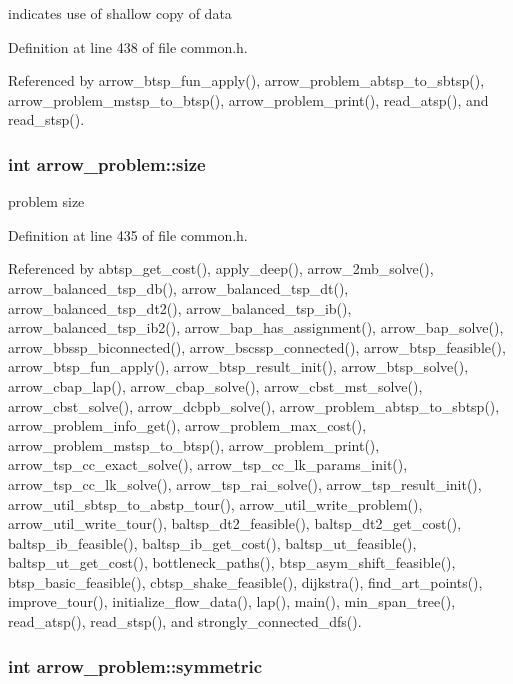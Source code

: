 indicates use of shallow copy of data 

Definition at line 438 of file common.h.

Referenced by arrow\_\-btsp\_\-fun\_\-apply(), arrow\_\-problem\_\-abtsp\_\-to\_\-sbtsp(), arrow\_\-problem\_\-mstsp\_\-to\_\-btsp(), arrow\_\-problem\_\-print(), read\_\-atsp(), and read\_\-stsp().\hypertarget{structarrow__problem_de8573ddc391d06b08b65923fca693ec}{
\subsubsection[{size}]{\setlength{\rightskip}{0pt plus 5cm}int {\bf arrow\_\-problem::size}}}
\label{structarrow__problem_de8573ddc391d06b08b65923fca693ec}


problem size 

Definition at line 435 of file common.h.

Referenced by abtsp\_\-get\_\-cost(), apply\_\-deep(), arrow\_\-2mb\_\-solve(), arrow\_\-balanced\_\-tsp\_\-db(), arrow\_\-balanced\_\-tsp\_\-dt(), arrow\_\-balanced\_\-tsp\_\-dt2(), arrow\_\-balanced\_\-tsp\_\-ib(), arrow\_\-balanced\_\-tsp\_\-ib2(), arrow\_\-bap\_\-has\_\-assignment(), arrow\_\-bap\_\-solve(), arrow\_\-bbssp\_\-biconnected(), arrow\_\-bscssp\_\-connected(), arrow\_\-btsp\_\-feasible(), arrow\_\-btsp\_\-fun\_\-apply(), arrow\_\-btsp\_\-result\_\-init(), arrow\_\-btsp\_\-solve(), arrow\_\-cbap\_\-lap(), arrow\_\-cbap\_\-solve(), arrow\_\-cbst\_\-mst\_\-solve(), arrow\_\-cbst\_\-solve(), arrow\_\-dcbpb\_\-solve(), arrow\_\-problem\_\-abtsp\_\-to\_\-sbtsp(), arrow\_\-problem\_\-info\_\-get(), arrow\_\-problem\_\-max\_\-cost(), arrow\_\-problem\_\-mstsp\_\-to\_\-btsp(), arrow\_\-problem\_\-print(), arrow\_\-tsp\_\-cc\_\-exact\_\-solve(), arrow\_\-tsp\_\-cc\_\-lk\_\-params\_\-init(), arrow\_\-tsp\_\-cc\_\-lk\_\-solve(), arrow\_\-tsp\_\-rai\_\-solve(), arrow\_\-tsp\_\-result\_\-init(), arrow\_\-util\_\-sbtsp\_\-to\_\-abstp\_\-tour(), arrow\_\-util\_\-write\_\-problem(), arrow\_\-util\_\-write\_\-tour(), baltsp\_\-dt2\_\-feasible(), baltsp\_\-dt2\_\-get\_\-cost(), baltsp\_\-ib\_\-feasible(), baltsp\_\-ib\_\-get\_\-cost(), baltsp\_\-ut\_\-feasible(), baltsp\_\-ut\_\-get\_\-cost(), bottleneck\_\-paths(), btsp\_\-asym\_\-shift\_\-feasible(), btsp\_\-basic\_\-feasible(), cbtsp\_\-shake\_\-feasible(), dijkstra(), find\_\-art\_\-points(), improve\_\-tour(), initialize\_\-flow\_\-data(), lap(), main(), min\_\-span\_\-tree(), read\_\-atsp(), read\_\-stsp(), and strongly\_\-connected\_\-dfs().\hypertarget{structarrow__problem_168ab92e9d7a873740a2550f4d3510d9}{
\subsubsection[{symmetric}]{\setlength{\rightskip}{0pt plus 5cm}int {\bf arrow\_\-problem::symmetric}}}
\label{structarrow__problem_168ab92e9d7a873740a2550f4d3510d9}


